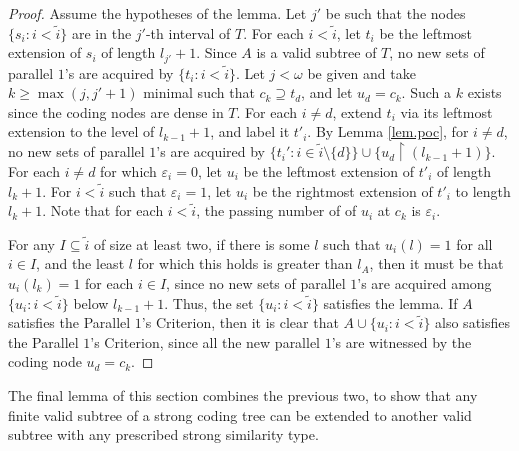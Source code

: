 \documentclass{amsart}
\theoremstyle{remark}
\theoremstyle{definition}
\theoremstyle{remark}
\newcommand{\om}{\omega}
\newcommand{\sse}{\subseteq}
\newcommand{\contains}{\supseteq}
\newcommand{\re}{\restriction}
\newcommand{\POC}{Parallel $1$'s Criterion}
\begin{document}
\begin{proof}
Assume the hypotheses of the lemma.
Let $j'$ be such that the nodes $\{s_i:i<\tilde{i}\}$ are in the $j'$-th interval of $T$.
For each $i<\tilde{i}$, let $t_i$ be the leftmost extension of $s_i$ of length $l_{j'}+1$.
Since $A$ is a valid subtree of $T$,
no new sets of parallel $1$'s are acquired by $\{t_i:i< \tilde{i}\}$.
Let $j<\om$ be given and
take $k\ge \max(j,j'+1)$ minimal such that $c_k\contains t_d$, and let $u_d=c_k$.
Such a $k$ exists since the coding nodes are dense in $T$.
For each  $i\ne d$,
extend $t_i$ via its leftmost extension to the level of
$l_{k-1}+1$, and label it $t'_i$.
By Lemma \ref{lem.poc},
 for $i\ne d$,
no  new  sets of parallel $1$'s  are acquired
by
$\{t_i':i\in\tilde{i}\setminus\{d\}\}\cup\{u_d\re (l_{k-1}+1)\}$.
For each $i\ne d$ for which $\varepsilon_i=0$,
let $u_i$ be the leftmost extension of $t'_i$ of length $l_k+1$.
For $i<\tilde{i}$ such that
 $\varepsilon_i=1$,
let $u_i$ be the rightmost extension of $t'_i$ to length
 $l_k+1$.
Note that  for each $i<\tilde{i}$,
the passing number of
of $u_i$ at  $c_k$  is
 $\varepsilon_i$.


For any $I\sse\tilde{i}$ of size at least two,
if there is some $l$ such that $u_i(l)=1$ for all $i\in I$,
and
 the least $l$ for which this holds is greater than  $l_A$,
then it must be that $u_i(l_k)=1$ for each $i\in I$,
 since
no new sets of parallel $1$'s are acquired among $\{u_i:i<\tilde{i}\}$ below $l_{k-1}+1$.
Thus, the set $\{u_i:i<\tilde{i}\}$ satisfies the lemma.
If $A$ satisfies the \POC,
then it is clear that $A\cup\{u_i:i<\tilde{i}\}$ also satisfies the \POC, since all the new parallel $1$'s are witnessed by the coding node $u_d=c_k$.
\end{proof}



The final lemma of this section combines the previous two, to show that any finite valid subtree of a strong coding tree can be extended to another valid subtree with any prescribed strong similarity type.
\end{document}

